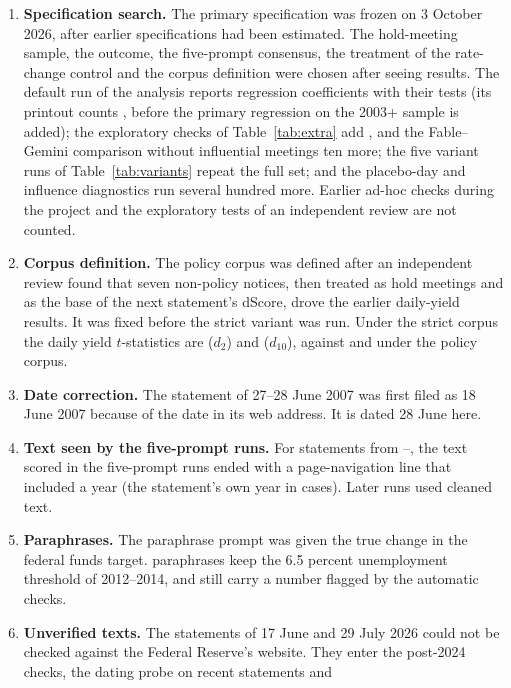 \begin{enumerate}
\item \textbf{Specification search.} The primary specification was frozen on 3 October 2026, after
earlier specifications had been estimated. The hold-meeting sample, the outcome, the five-prompt
consensus, the treatment of the rate-change control and the corpus definition were chosen after seeing
results. The default run of the analysis reports  regression coefficients with their tests
(its printout counts , before the primary regression on the 2003+ sample is added); the
exploratory checks of Table~\ref{tab:extra} add , and the Fable--Gemini comparison without
influential meetings ten more; the five variant runs of
Table~\ref{tab:variants} repeat the full set; and the placebo-day and influence diagnostics run several
hundred more. Earlier ad-hoc checks during the project and the exploratory tests of an independent
review are not counted.
\item \textbf{Corpus definition.} The policy corpus was defined after an independent review found that
seven non-policy notices, then treated as hold meetings and as the base of the next statement's dScore,
drove the earlier daily-yield results. It was fixed before the strict variant was run. Under the strict
corpus the daily yield $t$-statistics are  ($d_2$) and 
($d_{10}$), against  and  under the policy corpus.
\item \textbf{Date correction.} The statement of 27--28 June 2007 was first filed as 18 June 2007
because of the date in its web address. It is dated 28 June here.
\item \textbf{Text seen by the five-prompt runs.} For  statements from
--, the text scored in the five-prompt runs ended with a page-navigation line
that included a year (the statement's own year in  cases). Later runs used cleaned text.
\item \textbf{Paraphrases.} The paraphrase prompt was given the true change in the federal funds target.
 paraphrases keep the 6.5 percent unemployment threshold of 2012--2014, and
 still carry a number flagged by the automatic checks.
\item \textbf{Unverified texts.} The statements of 17 June and 29 July 2026 could not be checked against
the Federal Reserve's website. They enter the post-2024 checks, the dating probe on recent statements and

\end{enumerate}
